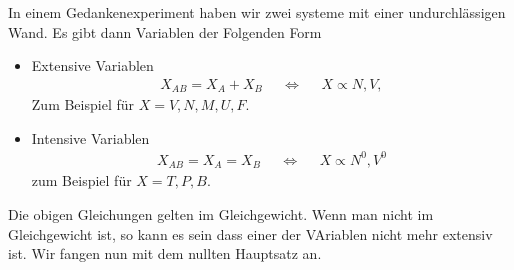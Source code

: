 In einem Gedankenexperiment haben wir zwei systeme mit einer undurchl\"assigen
Wand. Es gibt dann Variablen der Folgenden Form
\begin{itemize}
  \item Extensive Variablen
    \begin{align*}
      X_{AB} = X_A + X_B && \iff &&  X \propto N, V, 
    \end{align*}
    Zum Beispiel f\"ur $X = V, N, M, U, F$.
  \item Intensive Variablen
    \begin{align*}
      X_{AB} = X_A = X_B &&  \iff && X \propto N^0, V^0
    \end{align*}
    zum Beispiel f\"ur $X = T, P , B$.
\end{itemize}
Die obigen Gleichungen gelten im Gleichgewicht. Wenn man nicht im
Gleichgewicht ist, so kann es sein dass einer der VAriablen nicht mehr
extensiv ist. Wir fangen nun mit dem nullten Hauptsatz an.

